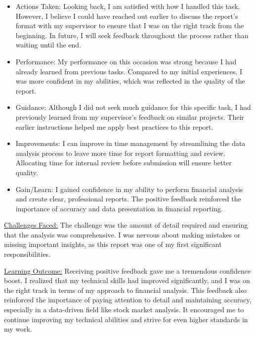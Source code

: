 \documentclass{article}
\begin{document}
\begin{titlepage}
\begin{titlepage}
\begin{flushleft}
\begin{flushleft}
\begin{itemize}
My Role:
I was responsible for collecting data, performing a thorough analysis, and preparing the final report. I used Excel for data analysis and employed visualization tools to create clear, concise graphs and charts.
\item
Actions Taken:
Looking back, I am satisfied with how I handled this task. However, I believe I could have reached out earlier to discuss the report's format with my supervisor to ensure that I was on the right track from the beginning. In future, I will seek feedback throughout the process rather than waiting until the end.
\item
Performance:
My performance on this occasion was strong because I had already learned from previous tasks. Compared to my initial experiences, I was more confident in my abilities, which was reflected in the quality of the report.
\item
Guidance:
Although I did not seek much guidance for this specific task, I had previously learned from my supervisor's feedback on similar projects. Their earlier instructions helped me apply best practices to this report.
\item
Improvements:
I can improve in time management by streamlining the data analysis process to leave more time for report formatting and review. Allocating time for internal review before submission will ensure better quality.
\item 
Gain/Learn:
I gained confidence in my ability to perform financial analysis and create clear, professional reports. The positive feedback reinforced the importance of accuracy and data presentation in financial reporting.
\end{itemize}

\underline{Challenges Faced:}
The challenge was the amount of detail required and ensuring that the analysis was comprehensive. I was nervous about making mistakes or missing important insights, as this report was one of my first significant responsibilities.
\vspace{0.15cm}

\underline{Learning Outcome:}
Receiving positive feedback gave me a tremendous confidence boost. I realized that my technical skills had improved significantly, and I was on the right track in terms of my approach to financial analysis. This feedback also reinforced the importance of paying attention to detail and maintaining accuracy, especially in a data-driven field like stock market analysis. It encouraged me to continue improving my technical abilities and strive for even higher standards in my work.
\vspace{0.5cm}


\end{flushleft}
\end{flushleft}
\end{titlepage}
\end{titlepage}
\end{document}
